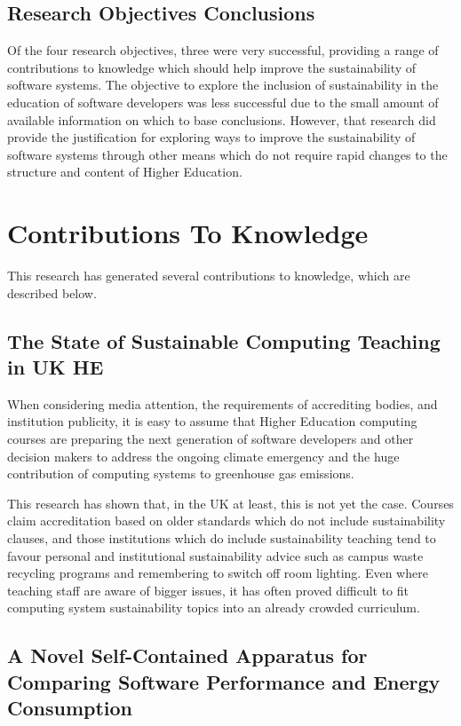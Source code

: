 \subsection{Research Objectives Conclusions}

Of the four research objectives, three were very successful, providing a range of contributions to knowledge which should help improve the sustainability of software systems. The objective to explore the inclusion of sustainability in the education of software developers was less successful due to the small amount of available information on which to base conclusions. However, that research did provide the justification for exploring ways to improve the sustainability of software systems through other means which do not require rapid changes to the structure and content of Higher Education.

\section{Contributions To Knowledge}
\label{section:contributions}

This research has generated several contributions to knowledge, which are described below.

\subsection{The State of Sustainable Computing Teaching in UK HE}
\label{contrib:HE}

When considering media attention, the requirements of accrediting bodies, and institution publicity, it is easy to assume that Higher Education computing courses are preparing the next generation of software developers and other decision makers to address the ongoing climate emergency and the huge contribution of computing systems to greenhouse gas emissions.

This research has shown that, in the UK at least, this is not yet the case. Courses claim accreditation based on older standards which do not include sustainability clauses, and those institutions which do include sustainability teaching tend to favour personal and institutional sustainability advice such as campus waste recycling programs and remembering to switch off room lighting. Even where teaching staff are aware of bigger issues, it has often proved difficult to fit computing system sustainability topics into an already crowded curriculum.

\subsection{A Novel Self-Contained Apparatus for Comparing Software Performance and Energy Consumption}
\label{contrib:apparatus}

